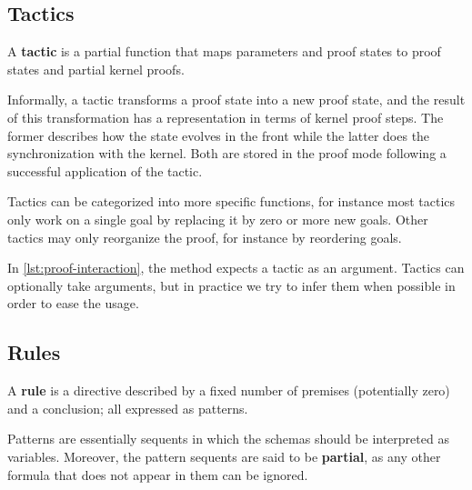 \subsection{Tactics}

\begin{definition}[Tactic]
A \textbf{tactic} is a partial function that maps parameters and proof states to proof states and partial kernel proofs.
\end{definition}

Informally, a tactic transforms a proof state into a new proof state, and the result of this transformation has a representation in terms of kernel proof steps. The former describes how the state evolves in the front while the latter does the synchronization with the kernel. Both are stored in the proof mode following a successful application of the tactic.

Tactics can be categorized into more specific functions, for instance most tactics only work on a single goal by replacing it by zero or more new goals. Other tactics may only reorganize the proof, for instance by reordering goals.

In \autoref{lst:proof-interaction}, the method  expects a tactic as an argument. Tactics can optionally take arguments, but in practice we try to infer them when possible in order to ease the usage.

\subsection{Rules}
\label{sec:proof-framework-rules}

\begin{definition}[Rule]
A \textbf{rule} is a directive described by a fixed number of premises (potentially zero) and a conclusion; all expressed as patterns.
\end{definition}

Patterns are essentially sequents in which the schemas should be interpreted as variables. Moreover, the pattern sequents are said to be \textbf{partial}, as any other formula that does not appear in them can be ignored.

